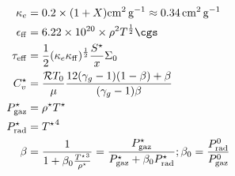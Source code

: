 \begin{subequations}
\begin{align}
        \kappa_e &= 0.2 \times (1 + X) \si{\square\centi\meter\per\gram} \approx \SI{0.34}{\square\centi\meter\per\gram} \\
        \epsilon_\mathrm{ff} &= \num{6.22e20} \times \rho^2 T^\frac{1}{2} \si{\cgs} \\
        \tau_\mathrm{eff} &= \frac{1}{2} (\kappa_e \kappa_\mathrm{ff})^\frac{1}{2} \frac{S^\star}{x} \Sigma_0 \\
        C_v^\star &= \frac{\mathcal{R} T_0}{\mu} \frac{12 (\gamma_g - 1)(1 - \beta) + \beta}{(\gamma_g - 1) \beta} \\
        P_\mathrm{gaz}^\star &= \rho^\star T^\star \\
        P_\mathrm{rad}^\star &= {T^\star}^4 \\
        \beta &= \frac{1}{1 + \beta_0 \frac{{T^\star}^3}{\rho^\star}} = \frac{P_\mathrm{gaz}^\star}{P_\mathrm{gaz}^\star + \beta_0 P_\mathrm{rad}^\star} ; \beta_0 = \frac{P_\mathrm{rad}^0}{P_\mathrm{gaz}^0}
    \end{align}
\end{subequations}
